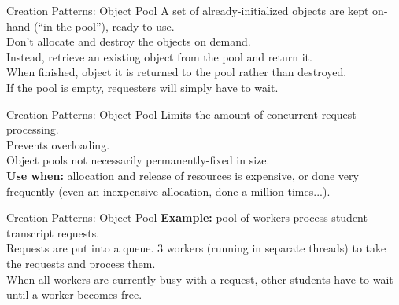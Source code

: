 \documentclass[14pt,aspectratio=169]{beamer}
\begin{document}
\begin{frame}{Creation Patterns: Object Pool}
A set of already-initialized objects are kept on-hand (``in the pool''), ready to use.\\
\vspace{1em}
Don't allocate and destroy the objects on demand. \\
\vspace{1em}
Instead, retrieve an existing object from the pool and return it.\\
\vspace{1em}
When finished, object it is returned to the pool rather than destroyed. \\
\vspace{1em}
If the pool is empty, requesters will simply have to wait.
\end{frame}



\begin{frame}{Creation Patterns: Object Pool}
Limits the amount of concurrent request processing.\\
\vspace{1em}
Prevents overloading.\\
\vspace{1em}
Object pools not necessarily permanently-fixed in size.\\
\vspace{1em}
\textbf{Use when:} allocation and release of resources is expensive, or done very frequently (even an inexpensive allocation, done a million times...).
\end{frame}



\begin{frame}{Creation Patterns: Object Pool}
\textbf{Example:} pool of workers process student transcript requests. \\
\vspace{1em}
Requests are put into a queue. 3 workers (running in separate threads) to take the requests and process them. \\
\vspace{1em}
When all workers are currently busy with a request, other students have to wait until a worker becomes free. 
\end{frame}
\end{document}
